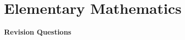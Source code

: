 \documentclass[twocolumn]{article}
\begin{document}
\section*{Elementary Mathematics}

{\bf \LARGE Revision Questions}

\end{document}
